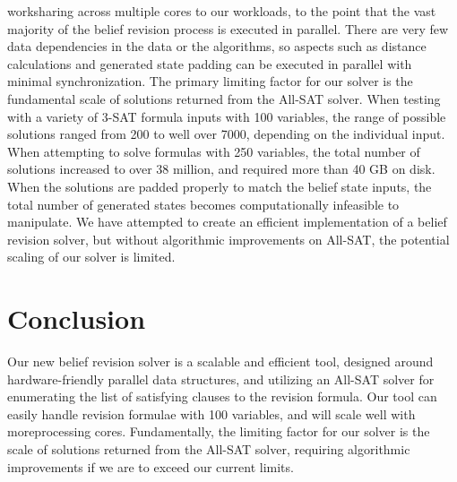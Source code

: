 \documentclass[english]{article}
\begin{document}
worksharing across multiple cores to our workloads, to the point that
the vast majority of the belief revision process is executed in parallel.
There are very few data dependencies in the data or the algorithms,
so aspects such as distance calculations and generated state padding
can be executed in parallel with minimal synchronization. The primary
limiting factor for our solver is the fundamental scale of solutions
returned from the All-SAT solver. When testing with a variety of 3-SAT
formula inputs with 100 variables, the range of possible solutions
ranged from 200 to well over 7000, depending on the individual input.
When attempting to solve formulas with 250 variables, the total number
of solutions increased to over 38 million, and required more than
40 GB on disk. When the solutions are padded properly to match the
belief state inputs, the total number of generated states becomes
computationally infeasible to manipulate. We have attempted to create
an efficient implementation of a belief revision solver, but without
algorithmic improvements on All-SAT, the potential scaling of our
solver is limited.

\section{Conclusion}

Our new belief revision solver is a scalable and efficient tool, designed
around hardware-friendly parallel data structures, and utilizing an
All-SAT solver for enumerating the list of satisfying clauses to the
revision formula. Our tool can easily handle revision formulae with
100 variables, and will scale well with moreprocessing cores. Fundamentally,
the limiting factor for our solver is the scale of solutions returned
from the All-SAT solver, requiring algorithmic improvements if we
are to exceed our current limits.
\end{document}
